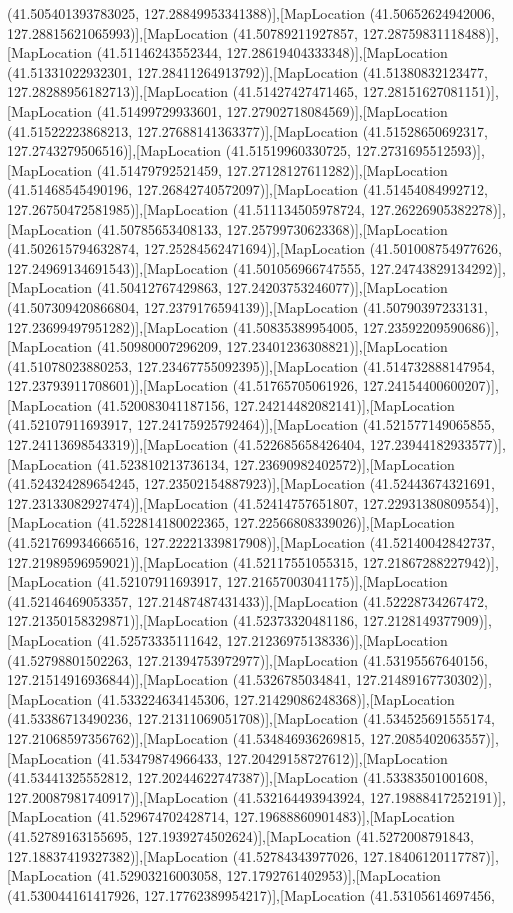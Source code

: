 (41.505401393783025, 127.28849953341388)],[MapLocation (41.50652624942006, 127.28815621065993)],[MapLocation (41.50789211927857, 127.28759831118488)],[MapLocation (41.51146243552344, 127.28619404333348)],[MapLocation (41.51331022932301, 127.28411264913792)],[MapLocation (41.51380832123477, 127.28288956182713)],[MapLocation (41.51427427471465, 127.28151627081151)],[MapLocation (41.51499729933601, 127.27902718084569)],[MapLocation (41.51522223868213, 127.27688141363377)],[MapLocation (41.51528650692317, 127.2743279506516)],[MapLocation (41.51519960330725, 127.2731695512593)],[MapLocation (41.51479792521459, 127.27128127611282)],[MapLocation (41.51468545490196, 127.26842740572097)],[MapLocation (41.51454084992712, 127.26750472581985)],[MapLocation (41.511134505978724, 127.26226905382278)],[MapLocation (41.50785653408133, 127.25799730623368)],[MapLocation (41.502615794632874, 127.25284562471694)],[MapLocation (41.501008754977626, 127.24969134691543)],[MapLocation (41.501056966747555, 127.24743829134292)],[MapLocation (41.50412767429863, 127.24203753246077)],[MapLocation (41.507309420866804, 127.2379176594139)],[MapLocation (41.50790397233131, 127.23699497951282)],[MapLocation (41.50835389954005, 127.23592209590686)],[MapLocation (41.50980007296209, 127.23401236308821)],[MapLocation (41.51078023880253, 127.23467755092395)],[MapLocation (41.514732888147954, 127.23793911708601)],[MapLocation (41.51765705061926, 127.24154400600207)],[MapLocation (41.520083041187156, 127.24214482082141)],[MapLocation (41.52107911693917, 127.24175925792464)],[MapLocation (41.521577149065855, 127.24113698543319)],[MapLocation (41.522685658426404, 127.23944182933577)],[MapLocation (41.523810213736134, 127.23690982402572)],[MapLocation (41.524324289654245, 127.23502154887923)],[MapLocation (41.52443674321691, 127.23133082927474)],[MapLocation (41.52414757651807, 127.22931380809554)],[MapLocation (41.522814180022365, 127.22566808339026)],[MapLocation (41.521769934666516, 127.22221339817908)],[MapLocation (41.52140042842737, 127.21989596959021)],[MapLocation (41.52117551055315, 127.21867288227942)],[MapLocation (41.52107911693917, 127.21657003041175)],[MapLocation (41.52146469053357, 127.21487487431433)],[MapLocation (41.52228734267472, 127.21350158329871)],[MapLocation (41.52373320481186, 127.2128149377909)],[MapLocation (41.52573335111642, 127.21236975138336)],[MapLocation (41.52798801502263, 127.21394753972977)],[MapLocation (41.53195567640156, 127.21514916936844)],[MapLocation (41.5326785034841, 127.21489167730302)],[MapLocation (41.533224634145306, 127.21429086248368)],[MapLocation (41.53386713490236, 127.21311069051708)],[MapLocation (41.534525691555174, 127.21068597356762)],[MapLocation (41.534846936269815, 127.2085402063557)],[MapLocation (41.53479874966433, 127.20429158727612)],[MapLocation (41.53441325552812, 127.20244622747387)],[MapLocation (41.53383501001608, 127.20087981740917)],[MapLocation (41.532164493943924, 127.19888417252191)],[MapLocation (41.529674702428714, 127.19688860901483)],[MapLocation (41.52789163155695, 127.1939274502624)],[MapLocation (41.5272008791843, 127.18837419327382)],[MapLocation (41.52784343977026, 127.18406120117787)],[MapLocation (41.52903216003058, 127.1792761402953)],[MapLocation (41.530044161417926, 127.17762389954217)],[MapLocation (41.53105614697456, 